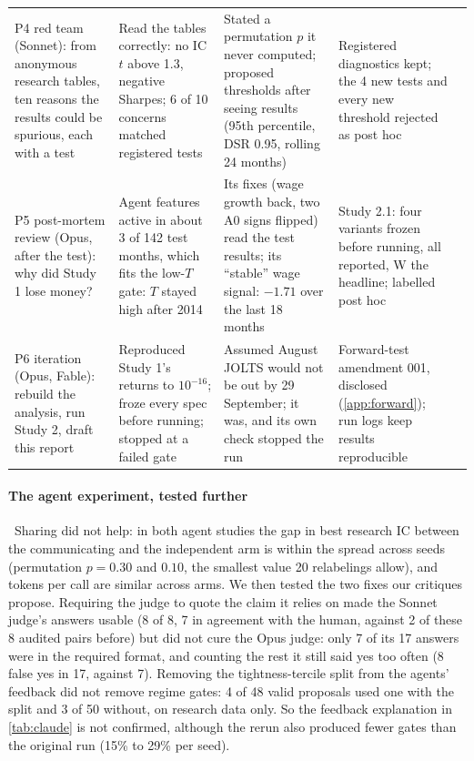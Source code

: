 \begin{table}[!tbp]
\begin{tabularx}{\textwidth}{@{}Y Y Y Y p{2.3cm}@{}}
P4 red team (Sonnet): from anonymous research tables, ten reasons the results could be spurious, each with a test & Read the tables correctly: no IC $t$ above 1.3, negative Sharpes; 6 of 10 concerns matched registered tests %
 & Stated a permutation $p$ it never computed; proposed thresholds after seeing results (95th percentile, DSR 0.95, rolling 24 months) %
 & Registered diagnostics kept; the 4 new tests and every new threshold rejected as post hoc %
 &  \\
P5 post-mortem review (Opus, after the test): why did Study 1 lose money? & Agent features active in about 3 of 142 test months, which fits the low-$T$ gate: $T$ stayed high after 2014 %
 & Its fixes (wage growth back, two A0 signs flipped) read the test results; its ``stable'' wage signal: $-1.71$ over the last 18 months %
 & Study 2.1: four variants frozen before running, all reported, W the headline; labelled post hoc %
 &  \\
P6 iteration (Opus, Fable): rebuild the analysis, run Study 2, draft this report & Reproduced Study 1's returns to $10^{-16}$; froze every spec before running; stopped at a failed gate %
 & Assumed August JOLTS would not be out by 29 September; it was, and its own check stopped the run %
 & Forward-test amendment 001, disclosed (\cref{app:forward}); run logs keep results reproducible %
 &  \\
\bottomrule
\end{tabularx}
\end{table}

\paragraph{The agent experiment, tested further} \tagp\ Sharing did not help: in both agent studies the gap in best research IC between the communicating and the independent arm is within the spread across seeds (permutation $p=0.30$ and $0.10$, the smallest value 20 relabelings allow), and tokens per call are similar across arms. %
We then tested the two fixes our critiques propose. Requiring the judge to quote the claim it relies on made the Sonnet judge's answers usable (8 of 8, 7 in agreement with the human, against 2 of these 8 audited pairs before) but did not cure the Opus judge: only 7 of its 17 answers were in the required format, and counting the rest it still said yes too often (8 false yes in 17, against 7). %
Removing the tightness-tercile split from the agents' feedback did not remove regime gates: 4 of 48 valid proposals used one with the split and 3 of 50 without, on research data only. %
So the feedback explanation in \cref{tab:claude} is not confirmed, although the rerun also produced fewer gates than the original run (15\% to 29\% per seed). %

